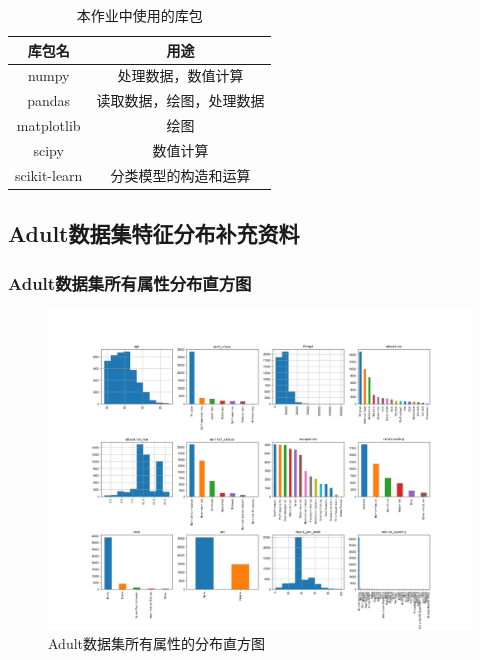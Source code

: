 \documentclass[12pt,a4paper]{article}
\theoremstyle{definition}
\begin{document}
{\begin{appendix}
	\begin{table}[H]
		\renewcommand\arraystretch{1.35}
		\caption{本作业中使用的库包}
		\label{tab:import}
		\centering
		
		\begin{tabular}{c|c}
			\centering
			库包名 &  用途 \\
			\hline
	
			numpy \cite{numpy} & 处理数据，数值计算 \\
			pandas \cite{pandas} & 读取数据，绘图，处理数据 \\
			matplotlib \cite{matplotlib} & 绘图 \\
			scipy \cite{scipy} & 数值计算 \\
			scikit-learn \cite{sklearn} & 分类模型的构造和运算 \\
	
		\end{tabular}
	\end{table}
	
	\subsection{Adult数据集特征分布补充资料}
	\label{dis_detail}
	
	\subsubsection{Adult数据集所有属性分布直方图}
	\label{apd:attri}
	
	\vspace{-0.02\linewidth}
	\begin{figure}[H]
		\centering
		\includegraphics[width=0.97\linewidth]{img/all_features.png}
		\caption{Adult数据集所有属性的分布直方图}
		\label{fig:all_features}
	\end{figure}
	

\end{appendix}}
\end{document}
